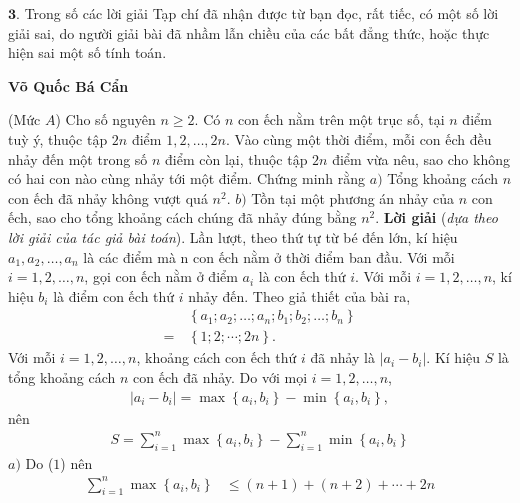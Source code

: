 \begin{multicols}{2}
	\vskip 0.05cm
	$\pmb{3.}$ Trong số các lời giải Tạp chí đã nhận được từ bạn đọc, rất tiếc, có một số lời giải sai, do người giải bài đã nhầm lẫn chiều của các bất đẳng thức, hoặc thực hiện sai một số tính toán.
	\begin{flushright}
		\textbf{\color{thachthuctoanhoc}Võ Quốc Bá Cẩn}
	\end{flushright}
	{}
	(Mức $A$) Cho số nguyên $n\ge2$. Có $n$ con ếch nằm trên một trục số, tại $n$ điểm tuỳ ý, thuộc tập $2n$ điểm $1,2,\ldots,2n$. Vào cùng một thời điểm, mỗi con ếch đều nhảy đến một trong số $n$ điểm còn lại, thuộc tập $2n$ điểm vừa nêu, sao cho không có hai con nào cùng nhảy tới một điểm. Chứng minh rằng
	\vskip 0.05cm
	$a)$ Tổng khoảng cách $n$ con ếch đã nhảy không vượt quá $n^2$. 
	\vskip 0.05cm
	$b)$ Tồn tại một phương án nhảy của $n$ con ếch, sao cho tổng khoảng cách chúng đã nhảy đúng bằng $n^2$. 
	\vskip 0.05cm
	\textbf{\color{thachthuctoanhoc}Lời giải} (\textit{dựa theo lời giải của tác giả bài toán}).
	\vskip 0.05cm
	Lần lượt, theo thứ tự từ bé đến lớn, kí hiệu ${a_1},{a_2}, \ldots ,{a_n}$  là các điểm mà n con ếch nằm ở thời điểm ban đầu.
	\vskip 0.05cm
	Với mỗi $i = 1, 2, \ldots, n$, gọi con ếch nằm ở điểm  $a_i$ là con ếch thứ $i$.
	\vskip 0.05cm
	Với mỗi $i = 1, 2, \ldots, n$, kí hiệu $b_i$  là điểm con ếch thứ $i$ nhảy đến.
	\vskip 0.05cm
	Theo giả thiết của bài ra,
	\begin{align*}
		&\left\{ {{a_1};{a_2}; \ldots ;{a_n};{b_1};{b_2}; \ldots ;{b_n}} \right\} \\
		= \,&\left\{ {1;2; \cdots ;2n} \right\}. \tag{$1$}
	\end{align*}
	Với mỗi $i = 1, 2, \ldots, n$, khoảng cách con ếch thứ $i$ đã nhảy là $\left| {{a_i} - {b_i}} \right|.$
	\vskip 0.05cm 
	Kí hiệu $S$ là tổng khoảng cách $n$ con ếch đã nhảy. Do với mọi $i = 1, 2, …, n$,
	\begin{align*}
		\left| {{a_i} - {b_i}} \right| = \max \left\{ {{a_i},{b_i}} \right\} - \min \left\{ {{a_i},{b_i}} \right\},
	\end{align*}
	nên
	\begin{align*}
		S = \sum\limits_{i = 1}^n {\max \left\{ {{a_i},{b_i}} \right\}}  - \sum\limits_{i = 1}^n {\min \left\{ {{a_i},{b_i}} \right\}}  \tag{$2$}
	\end{align*}
	$a)$ Do ($1$) nên
	\begin{align*}
		\sum\limits_{i = 1}^n {\max \left\{ {{a_i},{b_i}} \right\}}  &\le \left( {n + 1} \right) + \left( {n + 2} \right) +  \cdots  + 2n \\

\end{align*}
\end{multicols}
